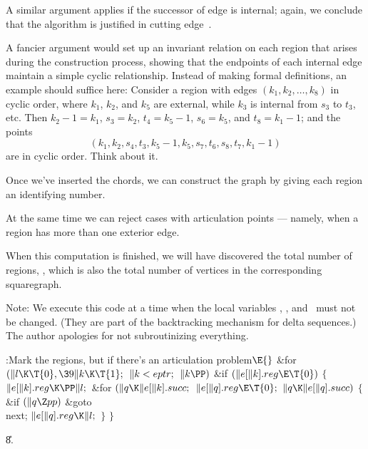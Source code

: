 A similar argument applies if the successor of edge  is internal;
again, we conclude that the  algorithm is justified
in cutting edge~.

A fancier argument would set up an invariant relation on each region
that arises during the construction process, showing that the
endpoints of each internal edge maintain a simple cyclic relationship.
Instead of making formal definitions, an example should suffice here:
Consider a region with edges $(k_1,k_2,\ldots,k_8)$ in cyclic order,
where $k_1$, $k_2$, and $k_5$ are external, while $k_3$ is
internal from $s_3$ to $t_3$, etc. Then $k_2-1=k_1$, $s_3=k_2$, $t_4=k_5-1$,
$s_6=k_5$, and $t_8=k_1-1$; and the points
$$(k_1,k_2,s_4,t_3,k_5-1,k_5,s_7,t_6,s_8,t_7,k_1-1)$$
are in cyclic order. Think about it.

\fi

Once we've inserted the chords, we can construct the graph by
giving each region an identifying number.

At the same time we can reject cases with articulation points ---
namely, when a region has more than one exterior edge.

When this computation is finished, we will have discovered the total number of
regions, , which is also the total number of vertices in the
corresponding
squaregraph.

Note: We execute this code at a time when the local variables , ,
and~ must not be changed. (They are part of the backtracking mechanism
for delta sequences.) The author apologies for not subroutinizing everything.

\Y\B\4:Mark the regions, but  if there's an
articulation problem\X${}\E{}$\6
\&{for} ${}(\|l\K\T{0},\39\|k\K\T{1};{}$ ${}\|k<\\{eptr};{}$ ${}\|k\PP){}$\1\6
\&{if} ${}(\|e[\|k].\\{reg}\E\T{0}){}$\5
${}\{{}$\1\6
${}\|e[\|k].\\{reg}\K\PP\|l;{}$\6
\&{for} ${}(\|q\K\|e[\|k].\\{succ};{}$ ${}\|e[\|q].\\{reg}\E\T{0};{}$ ${}\|q\K%
\|e[\|q].\\{succ}){}$\5
${}\{{}$\1\6
\&{if} ${}(\|q\Z\\{pp}){}$\1\5
\&{goto} \\{next};\2\6
${}\|e[\|q].\\{reg}\K\|l;{}$\6
\4${}\}{}$\2\6
\4${}\}{}$\2\2\par
\U8.\fi

